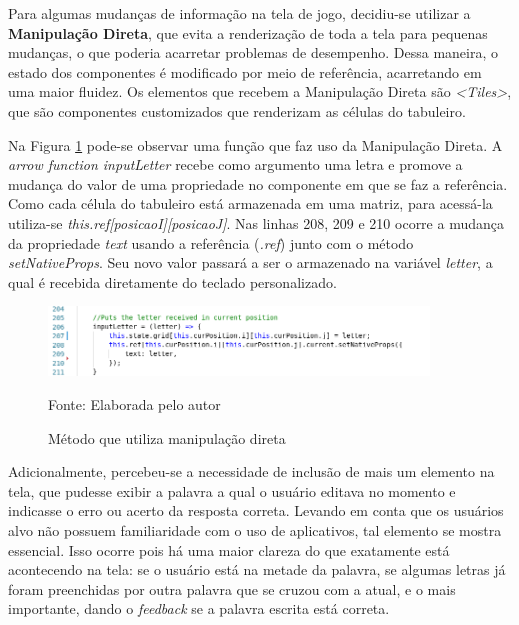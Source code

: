 Para algumas mudanças de informação na tela de jogo, decidiu-se utilizar a \textbf{Manipulação Direta}, que evita a renderização de toda a tela para pequenas mudanças, o que poderia acarretar problemas de desempenho. Dessa maneira, o estado dos componentes é modificado por meio de referência, acarretando em uma maior fluidez. Os elementos que recebem a Manipulação Direta são \textit{<Tiles>}, que são componentes customizados que renderizam as células do tabuleiro. 

Na Figura \ref{fig:codeDirectManipulation} pode-se observar uma função que faz uso da Manipulação Direta. A \textit{arrow function inputLetter} recebe como argumento uma letra e promove a mudança do valor de uma propriedade no componente em que se faz a referência. Como cada célula do tabuleiro está armazenada em uma matriz, para acessá-la utiliza-se \textit{this.ref[posicaoI][posicaoJ]}. Nas linhas 208, 209 e 210 ocorre a mudança da propriedade \textit{text} usando a referência (\textit{.ref}) junto com o método \textit{setNativeProps}. Seu novo valor passará a ser o armazenado na variável \textit{letter}, a qual é recebida diretamente do teclado personalizado.

\begin{figure}[H]
\centering
    \caption{Método que utiliza manipulação direta}
    \label{fig:codeDirectManipulation}
    \includegraphics[width=0.9\textwidth]{Figuras/codeDirectManipulation.png}
    
    Fonte: Elaborada pelo autor
\end{figure}

Adicionalmente, percebeu-se a necessidade de inclusão de mais um elemento na tela, que pudesse exibir a palavra a qual o usuário editava no momento e indicasse o erro ou acerto da resposta correta.
Levando em conta que os usuários alvo não possuem familiaridade com o uso de aplicativos, tal elemento se mostra essencial. Isso ocorre pois há uma maior clareza do que exatamente está acontecendo na tela: se o usuário está na metade da palavra, se algumas letras já foram preenchidas por outra palavra que se cruzou com a atual, e o mais importante, dando o \textit{feedback} se a palavra escrita está correta.

